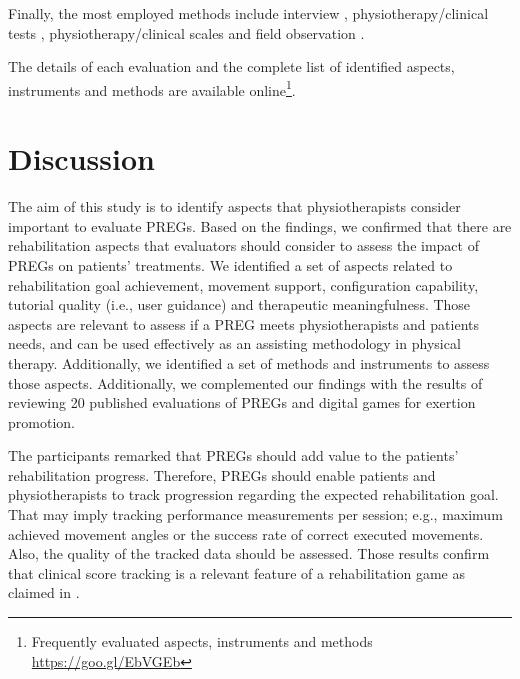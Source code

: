 Finally, the most employed methods include interview \autocite{PirovanoAdvisor2012,Ni2014,Brokaw2015,Celinder2012,Hernandez2013,Shin2014,McNeill2012}, physiotherapy/clinical tests \autocite{Wuest2014,PirovanoAdvisor2012,Brokaw2015,Sugarman2009,Shin2014,Saposnik2010}, physiotherapy/clinical scales \autocite{Brokaw2015,Berkovsky2010,Rand2008,Fitzgerald2008,Saposnik2010} and field observation \autocite{Brokaw2015,Celinder2012,Shin2014,Chang2011}.

The details of each evaluation and the complete list of identified aspects, instruments and methods are available online\footnote{Frequently evaluated aspects, instruments and methods \url{https://goo.gl/EbVGEb}}.


\section{Discussion}\label{sec:discussion_aspects} %
The aim of this study is to identify aspects that physiotherapists consider important to evaluate \acp{PREG}. Based on the findings, we confirmed that there are rehabilitation aspects that evaluators should consider to assess the impact of \acp{PREG} on patients' treatments. We identified a set of aspects related to rehabilitation goal achievement, movement support, configuration capability, tutorial quality (i.e., user guidance) and therapeutic meaningfulness. Those aspects are relevant to assess if a \ac{PREG} meets physiotherapists and patients needs, and can be used effectively as an assisting methodology in physical therapy. Additionally, we identified a set of methods and instruments to assess those aspects. Additionally, we complemented our findings with the results of reviewing 20 published evaluations of \acp{PREG} and digital games for exertion promotion.

The participants remarked that \acp{PREG} should add value to the patients' rehabilitation progress. Therefore, \acp{PREG} should enable patients and physiotherapists to track progression regarding the expected rehabilitation goal. That may imply tracking performance measurements per session; e.g., maximum achieved movement angles or the success rate of correct executed movements. Also, the quality of the tracked data should be assessed. Those results confirm that clinical score tracking is a relevant feature of a rehabilitation game as claimed in \autocite{Seo2016,PirovanoAdvisor2012}.

